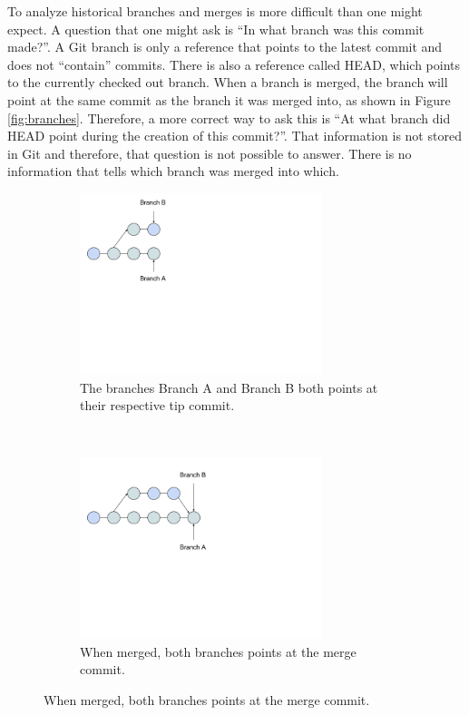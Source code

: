 To analyze historical branches and merges is more difficult than one might expect. A question that one might ask is “In what branch was this commit made?”. A Git branch is only a reference that points to the latest commit and does not “contain” commits. There is also a reference called HEAD, which points to the currently checked out branch. When a branch is merged, the branch will point at the same commit as the branch it was merged into, as shown in Figure \ref{fig:branches}. Therefore, a more correct way to ask this is “At what branch did HEAD point during the creation of this commit?”. That information is not stored in Git and therefore, that question is not possible to answer. There is no information that tells which branch was merged into which.
\begin{figure}
\centering
\begin{subfigure}[b]{0.3\textwidth}
    \includegraphics[width=200pt]{figure/branch1.png}
    \caption{The branches Branch A and Branch B both points at their respective tip commit.}
    \label{fig:mbranch1}
\end{subfigure}
~ %
\begin{subfigure}[b]{0.3\textwidth}
    \includegraphics[width=200pt]{figure/branch2.png}
    \caption{When merged, both branches points at the merge commit.}
    \label{fig:mbranch2}
\end{subfigure}

\end{figure}
